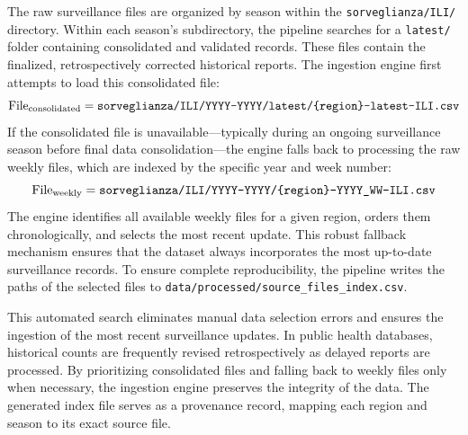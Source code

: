 The raw surveillance files are organized by season within the \texttt{sorveglianza/ILI/} directory. Within each season's subdirectory, the pipeline searches for a \texttt{latest/} folder containing consolidated and validated records. These files contain the finalized, retrospectively corrected historical reports. The ingestion engine first attempts to load this consolidated file:
\begin{equation*}
\text{File}_{\text{consolidated}} = \text{\texttt{sorveglianza/ILI/YYYY-YYYY/latest/\{region\}-latest-ILI.csv}}
\end{equation*}
If the consolidated file is unavailable---typically during an ongoing surveillance season before final data consolidation---the engine falls back to processing the raw weekly files, which are indexed by the specific year and week number:
\begin{equation*}
\text{File}_{\text{weekly}} = \text{\texttt{sorveglianza/ILI/YYYY-YYYY/\{region\}-YYYY\_WW-ILI.csv}}
\end{equation*}
The engine identifies all available weekly files for a given region, orders them chronologically, and selects the most recent update. This robust fallback mechanism ensures that the dataset always incorporates the most up-to-date surveillance records. To ensure complete reproducibility, the pipeline writes the paths of the selected files to \texttt{data/processed/source\_files\_index.csv}.

This automated search eliminates manual data selection errors and ensures the ingestion of the most recent surveillance updates. In public health databases, historical counts are frequently revised retrospectively as delayed reports are processed. By prioritizing consolidated files and falling back to weekly files only when necessary, the ingestion engine preserves the integrity of the data. The generated index file serves as a provenance record, mapping each region and season to its exact source file.

